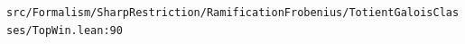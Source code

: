 \nolinkurl{src/Formalism/SharpRestriction/RamificationFrobenius/TotientGaloisClasses/TopWin.lean:90}%
